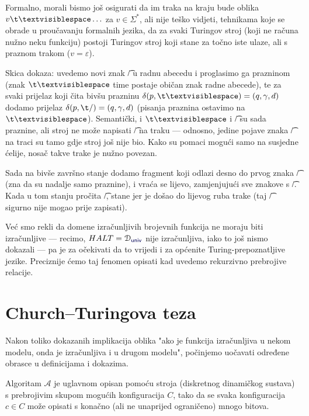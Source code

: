 \begin{napomena}\label{nap:re0}
Formalno, morali bismo još osigurati da im traka na kraju bude oblika $v\bl\ldots$ za $v\in\Sigma^*$, ali nije teško vidjeti, tehnikama koje se obrade u proučavanju formalnih jezika, da za svaki Turingov stroj (koji ne računa nužno neku funkciju) postoji Turingov stroj koji stane za točno iste ulaze, ali s praznom trakom ($v=\varepsilon$).

Skica dokaza: uvedemo novi znak \t/ u radnu abecedu i proglasimo ga prazninom (znak $\bl$ time postaje običan znak radne abecede), te za svaki prijelaz koji čita bivšu prazninu $\delta(p,\bl)=(q,\gamma,d)$ dodamo prijelaz $\delta(p,\t/)=(q,\gamma,d)$ (pisanja praznina ostavimo na $\bl$). Semantički, i $\bl$ i \t/ su sada praznine, ali stroj ne može napisati \t/ na traku --- odnosno, jedine pojave znaka \t/ na traci su tamo gdje stroj još nije bio. Kako su pomaci mogući samo na susjedne ćelije, nosač takve trake je nužno povezan.

Sada na bivše završno stanje dodamo fragment koji odlazi desno do prvog znaka \t/ (zna da su nadalje samo praznine), i vraća se lijevo, zamjenjujući sve znakove s \t/. Kada u tom stanju pročita \t/, stane jer je došao do lijevog ruba trake (taj \t/ sigurno nije mogao prije zapisati).
\end{napomena}

Već smo rekli da domene izračunljivih brojevnih funkcija ne moraju biti izračunljive --- recimo, $HALT=\dom{\f{univ}}$ nije izračunljiva, iako to još nismo dokazali --- pa je za očekivati da to vrijedi i za općenite Turing-prepoznatljive jezike. Preciznije ćemo taj fenomen opisati kad uvedemo rekurzivno prebrojive relacije.

\section{\texorpdfstring{Church--\!Turingova teza}{Church-Turingova teza}}
Nakon toliko dokazanih implikacija oblika "ako je funkcija izračunljiva u nekom modelu, onda je izračunljiva i u drugom modelu", počinjemo uočavati određene obrasce u definicijama i dokazima.


Algoritam $\mathcal A$ je uglavnom opisan pomoću stroja (diskretnog dinamičkog sustava) s prebrojivim skupom mogućih konfiguracija $C$, tako da se svaka konfiguracija $c\in C$ može opisati s konačno (ali ne unaprijed ograničeno) mnogo bitova.

